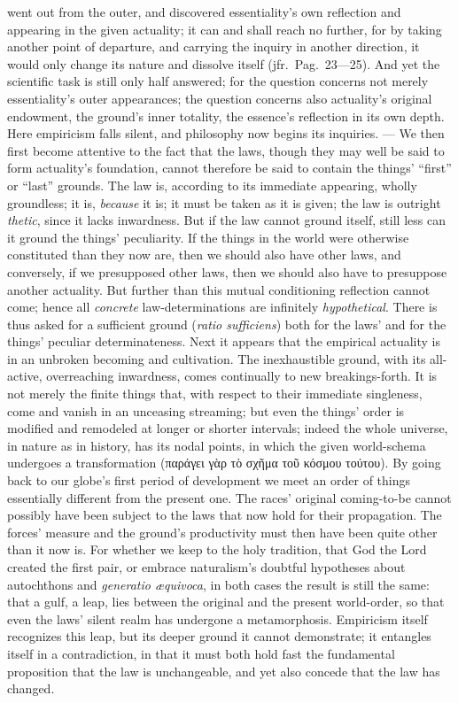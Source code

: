 \documentclass[12pt]{book}
\begin{document}
went out from the outer, and discovered essentiality's own reflection and
appearing in the given actuality; it can and shall reach no further, for by
taking another point of departure, and carrying the inquiry in another
direction, it would only change its nature and dissolve itself (jfr.\ Pag.\
23---25). And yet the scientific task is still only half answered; for the
question concerns not merely essentiality's outer appearances; the question
concerns also actuality's original endowment, the ground's inner totality,
the essence's reflection in its own depth. Here empiricism falls silent, and
philosophy now begins its inquiries. --- We then first become attentive to
the fact that the laws, though they may well be said to form actuality's
foundation, cannot therefore be said to contain the things' ``first'' or
``last'' grounds. The law is, according to its immediate appearing, wholly
groundless; it is, \emph{because} it is; it must be taken as it is given;
the law is outright \emph{thetic}, since it lacks inwardness. But if the law
cannot ground itself, still less can it ground the things' peculiarity. If
the things in the world were otherwise constituted than they now are, then
we should also have other laws, and conversely, if we presupposed other
laws, then we should also have to presuppose another actuality. But further
than this mutual conditioning reflection cannot come; hence all
\emph{concrete} law-determinations are infinitely \emph{hypothetical}. There
is thus asked for a sufficient ground (\textit{ratio sufficiens}) both for
the laws' and for the things' peculiar determinateness. Next it appears that
the empirical actuality is in an unbroken becoming and cultivation. The
inexhaustible ground, with its all-active, overreaching inwardness, comes
continually to new breakings-forth. It is not merely the finite things that,
with respect to their immediate singleness, come and vanish in an unceasing
streaming; but even the things' order is modified and remodeled at longer or
shorter intervals; indeed the whole universe, in nature as in history, has
its nodal points, in which the given world-schema undergoes a transformation
(παράγει γὰρ τὸ σχῆμα τοῦ κόσμου τούτου). By going back to our globe's first
period of development we meet an order of things essentially different from
the present one. The races' original coming-to-be cannot possibly have been
subject to the laws that now hold for their propagation. The forces' measure
and the ground's productivity must then have been quite other than it now
is. For whether we keep to the holy tradition, that God the Lord created the
first pair, or embrace naturalism's doubtful hypotheses about autochthons
and \textit{generatio æquivoca}, in both cases the result is still the same:
that a gulf, a leap, lies between the original and the present world-order,
so that even the laws' silent realm has undergone a metamorphosis.
Empiricism itself recognizes this leap, but its deeper ground it cannot
demonstrate; it entangles itself in a contradiction, in that it must both
hold fast the fundamental proposition that the law is unchangeable, and yet
also concede that the law has changed.
\end{document}
